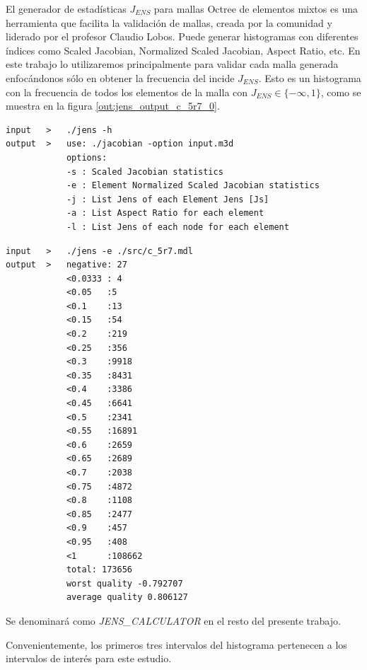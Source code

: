 El generador de estadísticas $J_{ENS}$ para mallas Octree de elementos mixtos es una herramienta que facilita la validación de mallas, creada por la comunidad y liderado por el profesor Claudio Lobos. Puede generar histogramas con diferentes índices como Scaled Jacobian, Normalized Scaled Jacobian, Aspect Ratio, etc. 
En este trabajo lo utilizaremos principalmente para validar cada malla generada enfocándonos sólo en obtener la frecuencia del incide $J_{ENS}$. Esto es un histograma con la frecuencia de todos los elementos de la malla con $J_{ENS} \in \{-\infty , 1\}$, como se muestra en la figura \autoref{out:jens_output_c_5r7_0}.

\begin{lstlisting}[style=console,caption={Opciones de jens calculator. \\ Fuente: Elaboración propia.}]
input   >   ./jens -h
output  >   use: ./jacobian -option input.m3d
            options:
            -s : Scaled Jacobian statistics
            -e : Element Normalized Scaled Jacobian statistics
            -j : List Jens of each Element Jens [Js]
            -a : List Aspect Ratio for each element
            -l : List Jens of each node for each element
\end{lstlisting}


\begin{lstlisting}[style=console,label={out:jens_output_c_5r7_0},caption={Estadísticas Jens para malla inicial, muestra una lista de frecuencias para diferentes cotas superiores para la calidad Jens encontrada en la malla.\\ Fuente: Elaboración propia.}]
input   >   ./jens -e ./src/c_5r7.mdl
output  >   negative: 27
            <0.0333 : 4
            <0.05   :5
            <0.1    :13
            <0.15   :54
            <0.2    :219
            <0.25   :356
            <0.3    :9918
            <0.35   :8431
            <0.4    :3386
            <0.45   :6641
            <0.5    :2341
            <0.55   :16891
            <0.6    :2659
            <0.65   :2689
            <0.7    :2038
            <0.75   :4872
            <0.8    :1108
            <0.85   :2477
            <0.9    :457
            <0.95   :408
            <1      :108662
            total: 173656
            worst quality -0.792707
            average quality 0.806127
\end{lstlisting}

Se denominará como \textit{JENS\_CALCULATOR} en el resto del presente trabajo.

Convenientemente, los primeros tres intervalos del histograma pertenecen a los intervalos de interés para este estudio.

